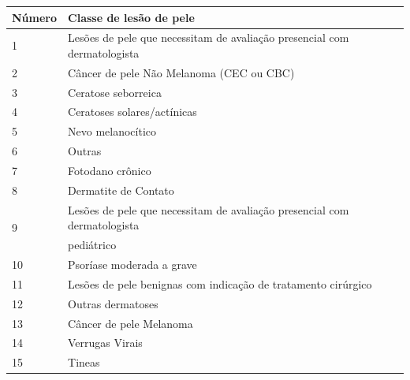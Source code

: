 \begin{table}[ht]
    \centering
    \begin{tabular}{l|l}
        \hline
        Número             & Classe de lesão de pele                                                  \\ \hline
        1                  & Lesões de pele que necessitam de avaliação presencial com dermatologista \\ \hline
        2                  & Câncer de pele Não Melanoma (CEC ou CBC)                                 \\ \hline
        3                  & Ceratose seborreica                                                      \\ \hline
        4                  & Ceratoses solares/actínicas                                              \\ \hline
        5                  & Nevo melanocítico                                                        \\ \hline
        6                  & Outras                                                                   \\ \hline
        7                  & Fotodano crônico                                                         \\ \hline
        8                  & Dermatite de Contato                                                     \\ \hline
        \multirow{2}{*}{9} & Lesões de pele que necessitam de avaliação presencial com dermatologista \\
                           & pediátrico                                                               \\ \hline
        10                 & Psoríase moderada a grave                                                \\ \hline
        11                 & Lesões de pele benignas com indicação de tratamento cirúrgico            \\ \hline
        12                 & Outras dermatoses                                                        \\ \hline
        13                 & Câncer de pele Melanoma                                                  \\ \hline
        14                 & Verrugas Virais                                                          \\ \hline
        15                 & Tineas                                                                   \\ \hline

\end{tabular}
\end{table}
